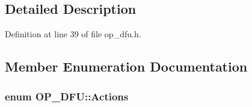 \subsection{Detailed Description}


Definition at line 39 of file op\-\_\-dfu.\-h.



\subsection{Member Enumeration Documentation}
\hypertarget{class_o_p___d_f_u_acd8a4a2768e971b531f67156fe40cca8}{
\subsubsection[{Actions}]{\setlength{\rightskip}{0pt plus 5cm}enum {\bf O\-P\-\_\-\-D\-F\-U\-::\-Actions}}}\label{class_o_p___d_f_u_acd8a4a2768e971b531f67156fe40cca8}

